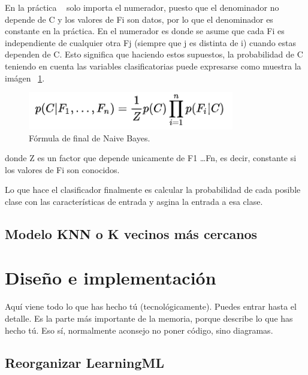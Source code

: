 \documentclass[a4paper, 12pt]{book}
\begin{document}
En la práctica ~\cite{machinelearning} solo importa el numerador, puesto que el denominador no depende de C y los valores de Fi son datos, por lo que el denominador es constante en la práctica. En el numerador es donde se asume que cada Fi es independiente de cualquier otra Fj (siempre que j es distinta de i) cuando estas dependen de C. Esto significa que haciendo estos supuestos, la probabilidad de C teniendo en cuenta las variables clasificatorias puede expresarse como muestra la imágen ~\ref{fig:ffinalbayes}.

\begin{figure}
  \centering
  \includegraphics[width=9cm, keepaspectratio]{img/ffinalbayes}
  \caption{Fórmula de final de Naive Bayes.}\label{fig:ffinalbayes}
\end{figure}

donde Z es un factor que depende unicamente de F1 \dots Fn, es decir, constante si los valores de Fi son conocidos.

Lo que hace el clasificador finalmente es calcular la probabilidad de cada posible clase con las características de entrada y asgina la entrada a esa clase.

\section{Modelo KNN o K vecinos más cercanos} 
\label{sec:modeloknn}




\cleardoublepage
\chapter{Diseño e implementación}

Aquí viene todo lo que has hecho tú (tecnológicamente). 
Puedes entrar hasta el detalle. 
Es la parte más importante de la memoria, porque describe lo que has hecho tú.
Eso sí, normalmente aconsejo no poner código, sino diagramas.

\section{Reorganizar LearningML} 
\label{sec:reorganizar}
\end{document}
